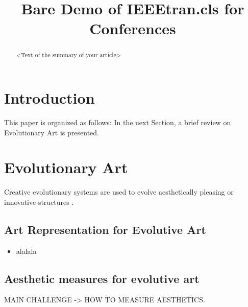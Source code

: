 \documentclass[conference]{IEEEtran}
\begin{document}
\title{Bare Demo of IEEEtran.cls for Conferences}
\author{
\and
{}
\and
{}
}

\maketitle

\begin{abstract}
<Text of the summary of your article>
\end{abstract}

\section{Introduction}\label{intro}

This paper is organized as follows: In the next Section, a brief review on Evolutionary Art is presented. 

\section{Evolutionary Art}\label{evo_art}

Creative evolutionary systems are used to evolve aesthetically pleasing or innovative structures \cite{dipaola2009incorporating}.

\subsection{Art Representation for Evolutive Art} \label{evo_art:repr}
\begin{itemize}
	\item alalala
\end{itemize}

\subsection{Aesthetic measures for evolutive art}\label{evo_art:aesth}
MAIN CHALLENGE -> HOW TO MEASURE AESTHETICS.
\end{document}
